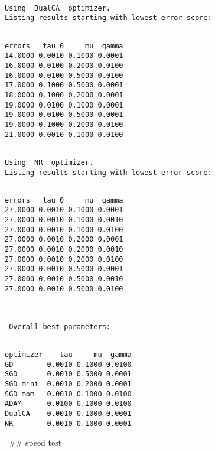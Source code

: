 \documentclass[11pt]{article}
\begin{document}
    
    \begin{Verbatim}[commandchars=\\\{\}]

Using  DualCA  optimizer.
Listing results starting with lowest error score: 


    \end{Verbatim}

    
    \begin{verbatim}
errors   tau_0     mu  gamma
14.0000 0.0010 0.1000 0.0001
16.0000 0.0100 0.2000 0.0100
16.0000 0.0100 0.5000 0.0100
17.0000 0.1000 0.5000 0.0001
18.0000 0.1000 0.2000 0.0001
19.0000 0.0100 0.1000 0.0001
19.0000 0.0100 0.5000 0.0001
19.0000 0.1000 0.2000 0.0100
21.0000 0.0010 0.1000 0.0100
    \end{verbatim}

    
    \begin{Verbatim}[commandchars=\\\{\}]

Using  NR  optimizer.
Listing results starting with lowest error score: 


    \end{Verbatim}

    
    \begin{verbatim}
errors   tau_0     mu  gamma
27.0000 0.0010 0.1000 0.0001
27.0000 0.0010 0.1000 0.0010
27.0000 0.0010 0.1000 0.0100
27.0000 0.0010 0.2000 0.0001
27.0000 0.0010 0.2000 0.0010
27.0000 0.0010 0.2000 0.0100
27.0000 0.0010 0.5000 0.0001
27.0000 0.0010 0.5000 0.0010
27.0000 0.0010 0.5000 0.0100
    \end{verbatim}

    
    \begin{Verbatim}[commandchars=\\\{\}]

 
 Overall best parameters: 


    \end{Verbatim}

    
    \begin{verbatim}
optimizer    tau     mu  gamma
GD        0.0010 0.1000 0.0100
SGD       0.0010 0.5000 0.0001
SGD_mini  0.0010 0.2000 0.0001
SGD_mom   0.0010 0.1000 0.0100
ADAM      0.0100 0.1000 0.0100
DualCA    0.0010 0.1000 0.0001
NR        0.0010 0.1000 0.0001
    \end{verbatim}

    
    ~\#\# speed test
\end{document}
